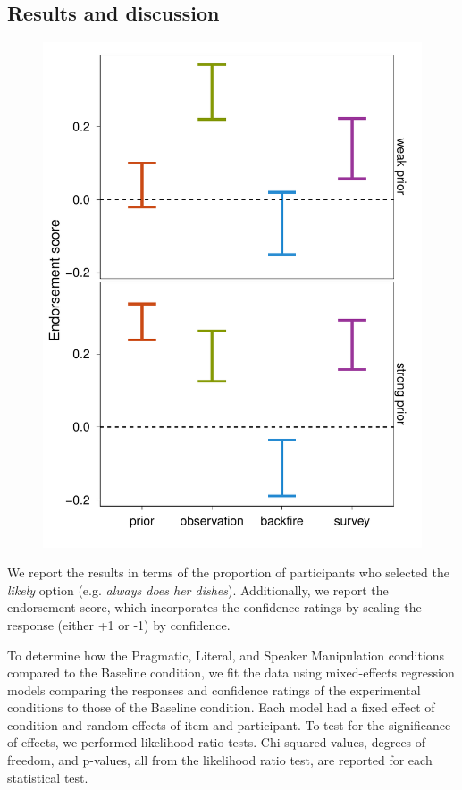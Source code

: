 \documentclass[10pt,letterpaper]{article}
\begin{document}
\subsection{Results and discussion}



\begin{figure}
\centering
    \includegraphics[width=\columnwidth]{fc2-score-medSplit}
    \caption{}
  \label{fig:expt1score}
\end{figure}

We report the results in terms of the proportion of participants who selected the \emph{likely} option (e.g. \emph{always does her dishes}). Additionally, we report the endorsement score, which incorporates the confidence ratings by scaling the response (either +1 or -1) by confidence. 

To determine how the Pragmatic, Literal, and Speaker Manipulation conditions compared to the Baseline condition, we fit the data using mixed-effects regression models comparing the responses and confidence ratings of the experimental conditions to those of the Baseline condition.  Each model had a fixed effect of condition and random effects of item and participant.  To test for the significance of effects, we performed likelihood ratio tests. Chi-squared values, degrees of freedom, and p-values, all from the likelihood ratio test, are reported for each statistical test.
\end{document}

